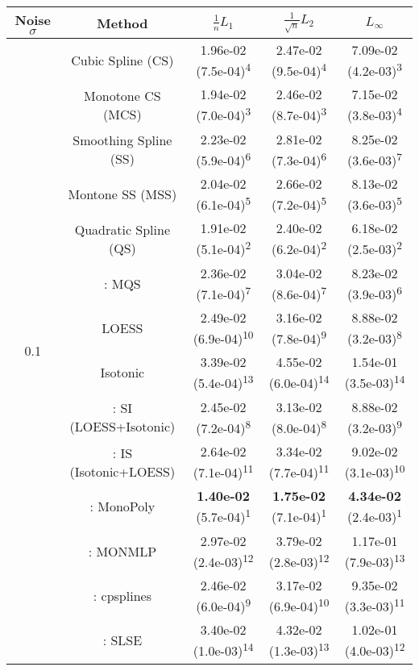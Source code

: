 \begin{tabular}{ccccc}
\toprule
Noise $\sigma$ & Method&$\frac 1n L_1$&$\frac{1}{\sqrt n}L_2$&$L_\infty$\tabularnewline
\midrule
\multirow{14}{*}{0.1}&Cubic Spline (CS)& 1.96e-02 (7.5e-04)\textsuperscript{4}& 2.47e-02 (9.5e-04)\textsuperscript{4}& 7.09e-02 (4.2e-03)\textsuperscript{3}\tabularnewline
&Monotone CS (MCS)& 1.94e-02 (7.0e-04)\textsuperscript{3}& 2.46e-02 (8.7e-04)\textsuperscript{3}& 7.15e-02 (3.8e-03)\textsuperscript{4}\tabularnewline
&Smoothing Spline (SS)& 2.23e-02 (5.9e-04)\textsuperscript{6}& 2.81e-02 (7.3e-04)\textsuperscript{6}& 8.25e-02 (3.6e-03)\textsuperscript{7}\tabularnewline
&Montone SS (MSS)& 2.04e-02 (6.1e-04)\textsuperscript{5}& 2.66e-02 (7.2e-04)\textsuperscript{5}& 8.13e-02 (3.6e-03)\textsuperscript{5}\tabularnewline
&Quadratic Spline (QS)& 1.91e-02 (5.1e-04)\textsuperscript{2}& 2.40e-02 (6.2e-04)\textsuperscript{2}& 6.18e-02 (2.5e-03)\textsuperscript{2}\tabularnewline
&\textcite{heMonotoneBsplineSmoothing1998}: MQS& 2.36e-02 (7.1e-04)\textsuperscript{7}& 3.04e-02 (8.6e-04)\textsuperscript{7}& 8.23e-02 (3.9e-03)\textsuperscript{6}\tabularnewline
&LOESS& 2.49e-02 (6.9e-04)\textsuperscript{10}& 3.16e-02 (7.8e-04)\textsuperscript{9}& 8.88e-02 (3.2e-03)\textsuperscript{8}\tabularnewline
&Isotonic& 3.39e-02 (5.4e-04)\textsuperscript{13}& 4.55e-02 (6.0e-04)\textsuperscript{14}& 1.54e-01 (3.5e-03)\textsuperscript{14}\tabularnewline
&\textcite{mammenEstimatingSmoothMonotone1991}: SI (LOESS+Isotonic)& 2.45e-02 (7.2e-04)\textsuperscript{8}& 3.13e-02 (8.0e-04)\textsuperscript{8}& 8.88e-02 (3.2e-03)\textsuperscript{9}\tabularnewline
&\textcite{mammenEstimatingSmoothMonotone1991}: IS (Isotonic+LOESS)& 2.64e-02 (7.1e-04)\textsuperscript{11}& 3.34e-02 (7.7e-04)\textsuperscript{11}& 9.02e-02 (3.1e-03)\textsuperscript{10}\tabularnewline
&\textcite{murrayFastFlexibleMethods2016a}: MonoPoly& \textbf{1.40e-02} (5.7e-04)\textsuperscript{1}& \textbf{1.75e-02} (7.1e-04)\textsuperscript{1}& \textbf{4.34e-02} (2.4e-03)\textsuperscript{1}\tabularnewline
&\textcite{cannonMonmlpMultilayerPerceptron2017}: MONMLP& 2.97e-02 (2.4e-03)\textsuperscript{12}& 3.79e-02 (2.8e-03)\textsuperscript{12}& 1.17e-01 (7.9e-03)\textsuperscript{13}\tabularnewline
&\textcite{navarro-garciaConstrainedSmoothingOutofrange2023}: cpsplines& 2.46e-02 (6.0e-04)\textsuperscript{9}& 3.17e-02 (6.9e-04)\textsuperscript{10}& 9.35e-02 (3.3e-03)\textsuperscript{11}\tabularnewline
&\textcite{groeneboomConfidenceIntervalsMonotone2023}: SLSE& 3.40e-02 (1.0e-03)\textsuperscript{14}& 4.32e-02 (1.3e-03)\textsuperscript{13}& 1.02e-01 (4.0e-03)\textsuperscript{12}\tabularnewline

\end{tabular}
